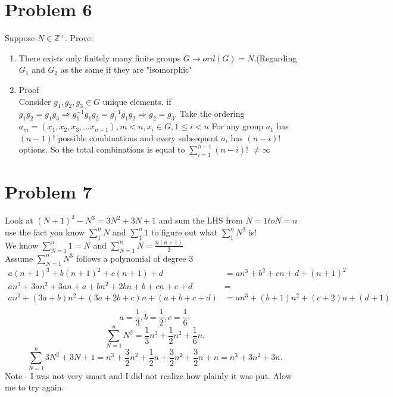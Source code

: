 \documentclass{article}
\begin{document}
    \section{Problem 6}
    Suppose $N \in \mathbb{Z}^{+}$. Prove:\\
    \begin{enumerate}
        \item
            There exists only finitely many finite groups $G \rightarrow ord(G) = N$.(Regarding $G_1$ and $G_2$ as the same if they are "isomorphic"\\
        \item 
            Proof\\
            Consider $g_1,g_2,g_3 \in G$ unique elements. if $g_1g_2=g_1g_3 \Rightarrow g_1^{-1}g_1g_2=g_1^{^-1}g_1g_2 \Rightarrow g_2=g_3$.
            Take the ordering $a_m = (x_1,x_2,x_3,...x_{n-1}), m<n, x_i \in G, 1 \le i < n$
            For any group $a_1$ has $(n-1)!$ possible combinations and every subsequent $a_i$ has $(n-i)!$ options. So the total combinations is
            equal to $\sum_{i=1}^{n-1}(n-i)!$ $\ne \infty$
            

    \end{enumerate}
    \section{Problem 7}
    Look at $(N+1)^{3}-N^{3} = 3N^2+3N+1$ and sum the LHS from $N=1 to N=n$ use the fact you know
    $\sum_{1}^{n}N$ and $\sum_{1}^{n}1$ to figure out what $\sum_{1}^{n}N^2$ is!
    \\
    We know $\sum_{N=1}^{n}1 = N$ and $\sum_{N=1}^{n}N = \frac{n(n+1)}{2}$ \\
    Assume $\sum_{N=1}^{n}N^{3}$ follows a polynomial of degree 3
    \begin{align*}
        a(n+1)^{3}+b(n+1)^{2}+c(n+1)+d &= an^{3}+b^2+cn+d +(n+1)^2 \\
        an^{3}+3an^2+3an+a+bn^2+2bn+b+cn+c+d &=\\
        an^{3}+(3a+b)n^2+(3a+2b+c)n+(a+b+c+d) &= an^{3} + (b+1)n^2+(c+2)n+(d+1)\\
    \end{align*}
    \[
    a=\frac{1}{3}, b=\frac{1}{2},c=\frac{1}{6}
    .\] 
    \[
    \sum_{N=1}^{n}N^2=\frac{1}{3}n^{3}+\frac{1}{2}n^2+\frac{1}{6}n
    .\] 
    \[
    \sum_{N=1}^{n}3N^2+3N+1 = n^{3}+\frac{3}{2}n^2+\frac{1}{2}n+\frac{3}{2}n^2+\frac{3}{2}n+n= n^3+3n^2+3n
    .\] 
    Note - I was not very smart and I did not realize how plainly it was put. Alow me to try again.\\
\end{document}
